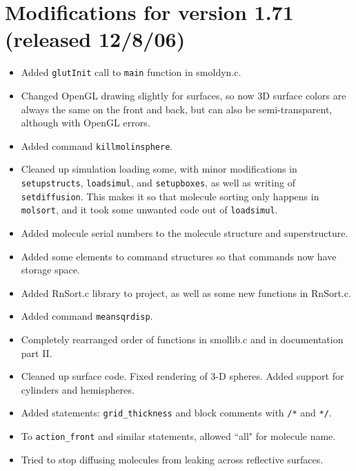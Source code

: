 \documentclass {scrbook}
\newcommand {\ttt} {\texttt}
\begin{document}
\section{Modifications for version 1.71 (released 12/8/06)}
\begin{itemize}
\item Added \ttt{glutInit} call to \ttt{main} function in smoldyn.c.
\item Changed OpenGL drawing slightly for surfaces, so now 3D surface colors are always the same on the front and back, but can also be semi-transparent, although with OpenGL errors.
\item Added command \ttt{killmolinsphere}.
\item Cleaned up simulation loading some, with minor modifications in \ttt{setupstructs}, \ttt{loadsimul}, and \ttt{setupboxes}, as well as writing of \ttt{setdiffusion}. This makes it so that molecule sorting only happens in \ttt{molsort}, and it took some unwanted code out of \ttt{loadsimul}.
\item Added molecule serial numbers to the molecule structure and superstructure.
\item Added some elements to command structures so that commands now have storage space.
\item Added RnSort.c library to project, as well as some new functions in RnSort.c.
\item Added command \ttt{meansqrdisp}.
\item Completely rearranged order of functions in smollib.c and in documentation part II.
\item Cleaned up surface code. Fixed rendering of 3-D spheres. Added support for cylinders and hemispheres.
\item Added statements: \ttt{grid\_thickness} and block comments with \ttt{/*} and \ttt{*/}.
\item To \ttt{action\_front} and similar statements, allowed ``all" for molecule name.
\item Tried to stop diffusing molecules from leaking across reflective surfaces.
\end{itemize}
\end{document}
